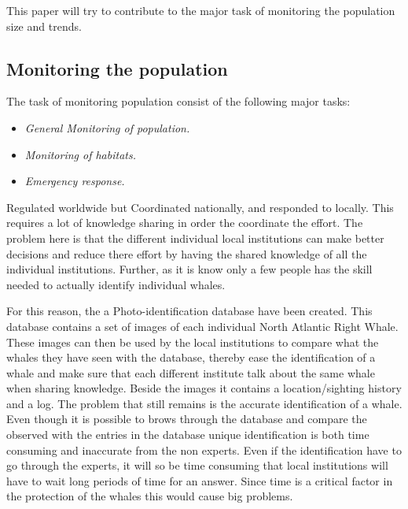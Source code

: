 This paper will try to contribute to the major task of monitoring the population size and trends. 

\subsection{Monitoring the population}
The task of monitoring population consist of the following major tasks:
\begin{itemize}
\item \textit{General Monitoring of population.}
\item \textit{Monitoring of habitats.}
\item \textit{Emergency response.}
\end{itemize}

Regulated worldwide but Coordinated nationally, and responded to locally. This requires a lot of knowledge sharing in order the coordinate the effort. The problem here is that the different individual local institutions can make better decisions and reduce there effort by having the shared knowledge of all the individual institutions.
Further, as it is know only a few people has the skill needed to actually identify individual whales.

For this reason, the a Photo-identification database have been created. This database contains a set of images of each individual North Atlantic Right Whale. 
These images can then be used by the local institutions to compare what the whales they have seen with the database, thereby ease the identification of a whale and make sure that each different institute talk about the same whale when sharing knowledge. Beside the images it contains a location/sighting history and a log.
The problem that still remains is the accurate identification of a whale. Even though it is possible to brows through the database and compare the observed with the entries in the database unique identification is both time consuming and inaccurate from the non experts.
Even if the identification have to go through the experts, it will so be time consuming that local institutions will have to wait long periods of time for an answer.
Since time is a critical factor in the protection of the whales this would cause big problems.
